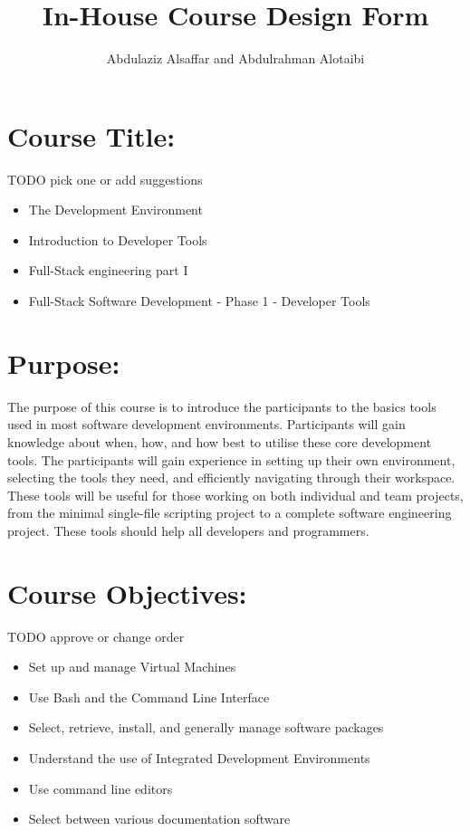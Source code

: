 \documentclass[a4paper,11pt]{article}
\author{Abdulaziz Alsa{f}far and Abdulrahman Alotaibi}
\title{In-House Course Design Form}
\begin{document}
\maketitle
\pagestyle{plain}
\setcounter{page}{1}

\section{Course Title:}
TODO pick one or add suggestions
\begin{itemize}
    \item The Development Environment
    \item Introduction to Developer Tools
    \item Full-Stack engineering part I
    \item Full-Stack Software Development - Phase 1 - Developer Tools
\end{itemize}

\section{Purpose:}
The purpose of this course is to introduce the participants to the basics tools used in most software development environments.
Participants will gain knowledge about when, how, and how best to utilise these core development tools. 
The participants will gain experience in setting up their own environment, selecting the tools they need, and e{f}ficiently navigating through their workspace. 
These tools will be useful for those working on both individual and team projects, from the minimal single-{f}ile scripting project to a complete software engineering project. These tools should help all developers and programmers.

\section{Course Objectives:}
TODO approve or change order
\begin{itemize}
	\item Set up and manage Virtual Machines
	\item Use Bash and the Command Line Interface
	\item Select, retrieve, install, and generally manage software packages
	\item Understand the use of Integrated Development Environments
	\item Use command line editors
	\item Select between various documentation software
\end{itemize}
\end{document}
